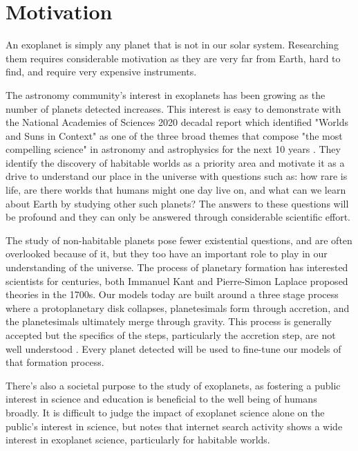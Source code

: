 \section{Motivation}
\label{sec:motivation}

An exoplanet is simply any planet that is not in our solar system. Researching
them requires considerable motivation as they are very far from Earth,
hard to find, and require very expensive instruments. 

The astronomy community's interest in exoplanets has been growing as the number
of planets detected increases. This interest is easy to demonstrate with the
National Academies of Sciences 2020 decadal report which identified "Worlds and
Suns in Context" as one of the three broad themes that compose "the most
compelling science" in astronomy and astrophysics for the next 10 years
\citep{nationalacademiesofsciencesPathwaysDiscoveryAstronomy2021}. They
identify the discovery of habitable worlds as a priority area and motivate it
as a drive to understand our place in the universe with questions such as: how
rare is life, are there worlds that humans might one day live on, and what can we
learn about Earth by studying other such planets? The answers to these questions
will be profound and they can only be answered through considerable scientific
effort.

The study of non-habitable planets pose fewer existential questions, and are
often overlooked because of it, but they too have an important role to play in
our understanding of the universe. The process of planetary formation has
interested scientists for centuries, both Immanuel Kant and Pierre-Simon
Laplace proposed theories \citep{Perryman2018a} in the 1700s. Our models today
are built around a three stage process where a protoplanetary disk collapses,
planetesimals form through accretion, and the planetesimals ultimately merge
through gravity\citep{Jeffery}. This process is generally accepted but the
specifics of the steps, particularly the accretion step, are not well
understood \citep{Perryman2018a}. Every planet detected will be used to
fine-tune our models of that formation process.

There's also a societal purpose to the study of exoplanets, as fostering a
public interest in science and education is beneficial to the well being of
humans broadly. It is difficult to judge the impact of exoplanet science alone
on the public's interest in science, but \citet{deegImpactExoplanet2018} notes
that internet search activity shows a wide interest in exoplanet science,
particularly for habitable worlds.

